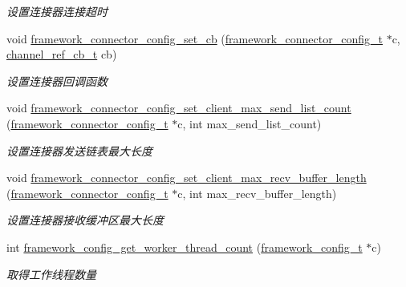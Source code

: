 \begin{DoxyCompactItemize}
\begin{DoxyCompactList}\small\item\em 设置连接器连接超时 \end{DoxyCompactList}\item 
void \hyperlink{a00054_aaa7b13871a9aca1dbb5ebfe1ece2dde8_aaa7b13871a9aca1dbb5ebfe1ece2dde8}{framework\+\_\+connector\+\_\+config\+\_\+set\+\_\+cb} (\hyperlink{a00050_a81253f4c995b97e69be0e67f7a26097f_a81253f4c995b97e69be0e67f7a26097f}{framework\+\_\+connector\+\_\+config\+\_\+t} $\ast$c, \hyperlink{a00050_ae296ec4d1ce108960de8dcc423956a1d_ae296ec4d1ce108960de8dcc423956a1d}{channel\+\_\+ref\+\_\+cb\+\_\+t} cb)
\begin{DoxyCompactList}\small\item\em 设置连接器回调函数 \end{DoxyCompactList}\item 
void \hyperlink{a00054_a0afe3e1f2612f39667940fc336312cb9_a0afe3e1f2612f39667940fc336312cb9}{framework\+\_\+connector\+\_\+config\+\_\+set\+\_\+client\+\_\+max\+\_\+send\+\_\+list\+\_\+count} (\hyperlink{a00050_a81253f4c995b97e69be0e67f7a26097f_a81253f4c995b97e69be0e67f7a26097f}{framework\+\_\+connector\+\_\+config\+\_\+t} $\ast$c, int max\+\_\+send\+\_\+list\+\_\+count)
\begin{DoxyCompactList}\small\item\em 设置连接器发送链表最大长度 \end{DoxyCompactList}\item 
void \hyperlink{a00054_a2b6beeacea30cd3aacb8802bb0323476_a2b6beeacea30cd3aacb8802bb0323476}{framework\+\_\+connector\+\_\+config\+\_\+set\+\_\+client\+\_\+max\+\_\+recv\+\_\+buffer\+\_\+length} (\hyperlink{a00050_a81253f4c995b97e69be0e67f7a26097f_a81253f4c995b97e69be0e67f7a26097f}{framework\+\_\+connector\+\_\+config\+\_\+t} $\ast$c, int max\+\_\+recv\+\_\+buffer\+\_\+length)
\begin{DoxyCompactList}\small\item\em 设置连接器接收缓冲区最大长度 \end{DoxyCompactList}\item 
int \hyperlink{a00054_aca3f6b57e6c3e601ddf2ecd8d536aa32_aca3f6b57e6c3e601ddf2ecd8d536aa32}{framework\+\_\+config\+\_\+get\+\_\+worker\+\_\+thread\+\_\+count} (\hyperlink{a00050_a55b26efa9e6ee05514d087ba2593a54b_a55b26efa9e6ee05514d087ba2593a54b}{framework\+\_\+config\+\_\+t} $\ast$c)
\begin{DoxyCompactList}\small\item\em 取得工作线程数量 \end{DoxyCompactList}\item 

\end{DoxyCompactItemize}

